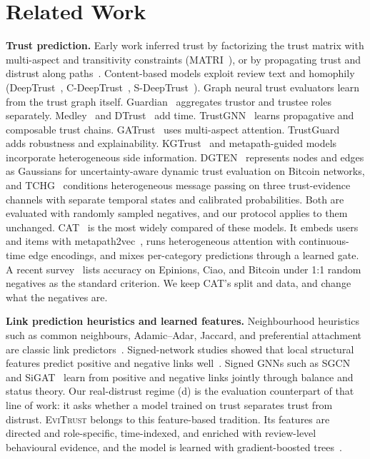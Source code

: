 \documentclass[conference]{IEEEtran}
\newcommand{\evi}{\textsc{EviTrust}}
\begin{document}
\section{Related Work}
\label{sec:related}

\textbf{Trust prediction.} Early work inferred trust by factorizing the trust matrix with multi-aspect and transitivity constraints (MATRI~\cite{yao2013matri}), or by propagating trust and distrust along paths~\cite{guha2004propagation}. Content-based models exploit review text and homophily (DeepTrust~\cite{wang2019deeptrust}, C-DeepTrust~\cite{wang2023cdeeptrust}, S-DeepTrust~\cite{wang2023sdeeptrust}). Graph neural trust evaluators learn from the trust graph itself. Guardian~\cite{lin2020guardian} aggregates trustor and trustee roles separately. Medley~\cite{lin2021medley} and DTrust~\cite{wen2023dtrust} add time. TrustGNN~\cite{huo2023trustgnn} learns propagative and composable trust chains. GATrust~\cite{jiang2023gatrust} uses multi-aspect attention. TrustGuard~\cite{wang2024trustguard} adds robustness and explainability. KGTrust~\cite{yu2023kgtrust} and metapath-guided models~\cite{xu2023metapath} incorporate heterogeneous side information. DGTEN~\cite{usman2025dgten} represents nodes and edges as Gaussians for uncertainty-aware dynamic trust evaluation on Bitcoin networks, and TCHG~\cite{liao2026tchg} conditions heterogeneous message passing on three trust-evidence channels with separate temporal states and calibrated probabilities. Both are evaluated with randomly sampled negatives, and our protocol applies to them unchanged. CAT~\cite{wang2025cat} is the most widely compared of these models. It embeds users and items with metapath2vec~\cite{dong2017metapath2vec}, runs heterogeneous attention with continuous-time edge encodings, and mixes per-category predictions through a learned gate. A recent survey~\cite{luo2025gnntrust} lists accuracy on Epinions, Ciao, and Bitcoin under 1:1 random negatives as the standard criterion. We keep CAT's split and data, and change what the negatives are.

\textbf{Link prediction heuristics and learned features.} Neighbourhood heuristics such as common neighbours, Adamic--Adar, Jaccard, and preferential attachment are classic link predictors~\cite{libennowell2007link,adamic2003friends}. Signed-network studies showed that local structural features predict positive and negative links well~\cite{leskovec2010predicting}. Signed GNNs such as SGCN~\cite{derr2018sgcn} and SiGAT~\cite{huang2019sigat} learn from positive and negative links jointly through balance and status theory. Our real-distrust regime (d) is the evaluation counterpart of that line of work: it asks whether a model trained on trust separates trust from distrust. \evi{} belongs to this feature-based tradition. Its features are directed and role-specific, time-indexed, and enriched with review-level behavioural evidence, and the model is learned with gradient-boosted trees~\cite{ke2017lightgbm}.
\end{document}
